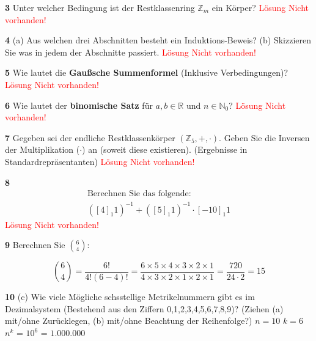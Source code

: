 \documentclass[11pt]{article}
\begin{document}
    \textbf{3} Unter welcher Bedingung ist der Restklassenring \(\mathbb{Z}_m\) ein Körper?\newline
    \textcolor{red}{Lösung Nicht vorhanden!}\newline

    \textbf{4} (a) Aus welchen drei Abschnitten besteht ein Induktions-Beweis? (b) Skizzieren Sie was in jedem der Abschnitte passiert.\newline
    \textcolor{red}{Lösung Nicht vorhanden!}\newline
    
    \textbf{5} Wie lautet die \textbf{Gaußsche Summenformel} (Inklusive Verbedingungen)?\newline
    \textcolor{red}{Lösung Nicht vorhanden!}\newline

    \textbf{6} Wie lautet der \textbf{binomische Satz} für \( a, b \in \mathbb{R} \) und \( n \in \mathbb{N}_0 \)?\newline
    \textcolor{red}{Lösung Nicht vorhanden!}\newline

    \textbf{7} Gegeben sei der endliche Restklassenkörper \((\mathbb{Z}_5, +, \cdot)\). Geben Sie die Inversen der Multiplikation (\(\cdot\)) an (soweit diese existieren). (Ergebnisse in Standardrepräsentanten)\newline
    \textcolor{red}{Lösung Nicht vorhanden!}\newline

    \textbf{8} \[
                   \begin{gathered}
                       \text{Berechnen Sie das folgende:} \\
                       \left([4]_1 1\right)^{-1} + \left([5]_1 1\right)^{-1} \cdot [-10]_1 1
                   \end{gathered}
    \]\newline
    \textcolor{red}{Lösung Nicht vorhanden!}\newline

    \textbf{9} Berechnen Sie \(\binom{6}{4}\):

    \[
        \binom{6}{4} = \frac{6!}{4!(6-4)!} = \frac{6 \times 5 \times 4 \times 3 \times 2 \times 1}{4 \times 3 \times 2 \times 1 \times 2 \times 1} = \frac{720}{24 \cdot 2} = 15
    \]


    \textbf{10} (c) Wie viele Mögliche schsstellige Metrikelnummern gibt es im Dezimalsystem (Bestehend aus den Ziffern {0,1,2,3,4,5,6,7,8,9})? (Ziehen (a) mit/ohne Zurücklegen, (b) mit/ohne Beachtung der Reihenfolge?)\newline
    $n = 10$\newline
    $k = 6$
    $n^{k}$ = $10^{6}$ = $1.000.000$
\end{document}
